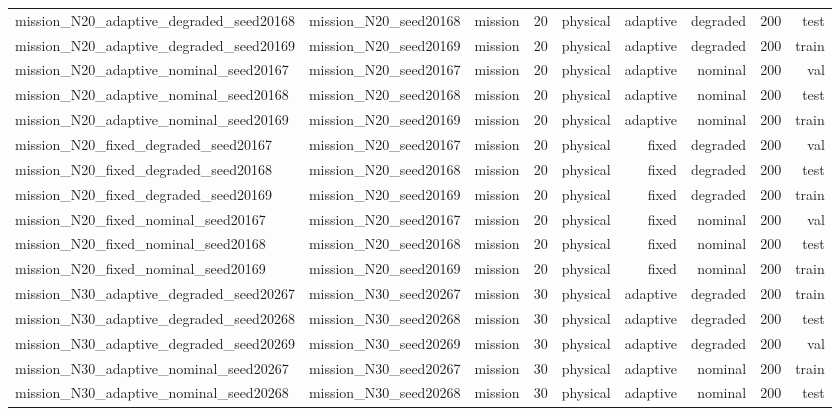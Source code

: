 \begin{tabular}{lrrrrrrrr}
mission\_N20\_adaptive\_degraded\_seed20168 & mission\_N20\_seed20168 & mission & 20 & physical & adaptive & degraded & 200 & test \\
mission\_N20\_adaptive\_degraded\_seed20169 & mission\_N20\_seed20169 & mission & 20 & physical & adaptive & degraded & 200 & train \\
mission\_N20\_adaptive\_nominal\_seed20167 & mission\_N20\_seed20167 & mission & 20 & physical & adaptive & nominal & 200 & val \\
mission\_N20\_adaptive\_nominal\_seed20168 & mission\_N20\_seed20168 & mission & 20 & physical & adaptive & nominal & 200 & test \\
mission\_N20\_adaptive\_nominal\_seed20169 & mission\_N20\_seed20169 & mission & 20 & physical & adaptive & nominal & 200 & train \\
mission\_N20\_fixed\_degraded\_seed20167 & mission\_N20\_seed20167 & mission & 20 & physical & fixed & degraded & 200 & val \\
mission\_N20\_fixed\_degraded\_seed20168 & mission\_N20\_seed20168 & mission & 20 & physical & fixed & degraded & 200 & test \\
mission\_N20\_fixed\_degraded\_seed20169 & mission\_N20\_seed20169 & mission & 20 & physical & fixed & degraded & 200 & train \\
mission\_N20\_fixed\_nominal\_seed20167 & mission\_N20\_seed20167 & mission & 20 & physical & fixed & nominal & 200 & val \\
mission\_N20\_fixed\_nominal\_seed20168 & mission\_N20\_seed20168 & mission & 20 & physical & fixed & nominal & 200 & test \\
mission\_N20\_fixed\_nominal\_seed20169 & mission\_N20\_seed20169 & mission & 20 & physical & fixed & nominal & 200 & train \\
mission\_N30\_adaptive\_degraded\_seed20267 & mission\_N30\_seed20267 & mission & 30 & physical & adaptive & degraded & 200 & train \\
mission\_N30\_adaptive\_degraded\_seed20268 & mission\_N30\_seed20268 & mission & 30 & physical & adaptive & degraded & 200 & test \\
mission\_N30\_adaptive\_degraded\_seed20269 & mission\_N30\_seed20269 & mission & 30 & physical & adaptive & degraded & 200 & val \\
mission\_N30\_adaptive\_nominal\_seed20267 & mission\_N30\_seed20267 & mission & 30 & physical & adaptive & nominal & 200 & train \\
mission\_N30\_adaptive\_nominal\_seed20268 & mission\_N30\_seed20268 & mission & 30 & physical & adaptive & nominal & 200 & test \\

\end{tabular}

